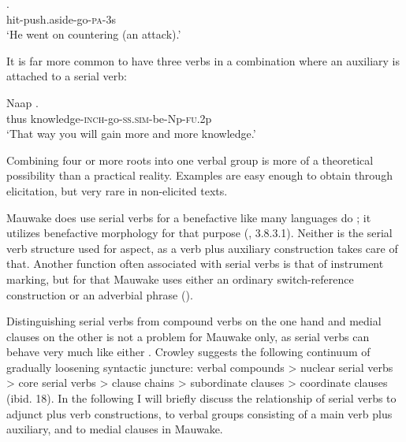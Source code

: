 \ea%
\label{ex:x385}
\gll {}. \\
hit-push.aside-go-\textsc{pa}-3s \\
\glt`He went on countering (an attack).'
\z

It is far more common to have three verbs in a combination where an auxiliary is attached to a serial verb:

\ea%
\label{ex:x386}
\gll Naap . \\
thus knowledge-\textsc{inch}-go-\textsc{ss}.\textsc{sim}-be-Np-\textsc{fu}.2p \\
\glt`That way you will gain more and more knowledge.'
\z

Combining four or more roots into one verbal group is more of a theoretical possibility than a practical reality. Examples are easy enough to obtain through elicitation, but very rare in non-elicited texts.

Mauwake does  use serial verbs for a benefactive like many languages do \citep[174--80]{Sebba1987}; it utilizes benefactive morphology for that purpose (, 3.8.3.1). Neither is the serial verb structure used for aspect, as a verb plus auxiliary construction takes care of that. Another function often associated with serial verbs is that of instrument marking, but for that Mauwake uses either an ordinary switch-reference construction or an adverbial phrase ().

Distinguishing serial verbs from compound verbs on the one hand and medial clauses on the other is not a problem for Mauwake only, as serial verbs can behave very much like either \citep[17]{Crowley2002}. Crowley suggests the following continuum of gradually loosening syntactic juncture: verbal compounds {{\textgreater}} nuclear serial verbs {{\textgreater}} core serial verbs {{\textgreater}} clause chains {{\textgreater}} subordinate clauses {{\textgreater}} coordinate clauses (ibid. 18). In the following I will briefly discuss the relationship of serial verbs to adjunct plus verb constructions, to verbal groups consisting of a main verb plus auxiliary, and to medial clauses in Mauwake. 

